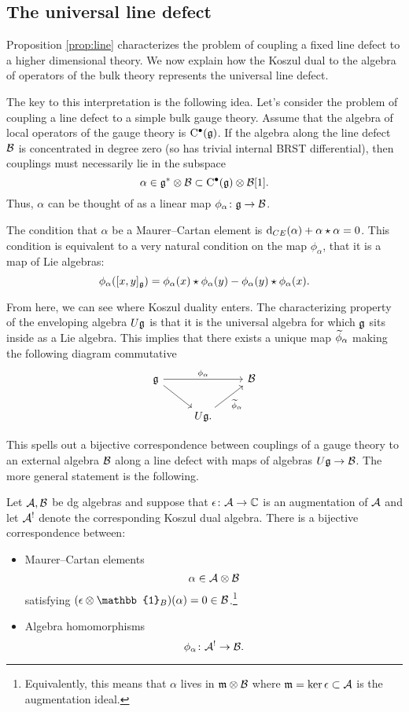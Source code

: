 \documentclass[11pt]{amsart}
\def\id{\mathbb{1}}
\begin{document}
\subsection{The universal line defect}
\label{sec:univ}

Proposition \ref{prop:line} characterizes the problem of coupling a fixed line defect to a higher dimensional theory. 
We now explain how the Koszul dual to the algebra of operators of the bulk theory represents the universal line defect. 

The key to this interpretation is the following idea.
Let's consider the problem of coupling a line defect to a simple bulk gauge theory. 
Assume that the algebra of local operators of the gauge theory is ${\rm C}^\bullet(\mathfrak g)$.
If the algebra along the line defect $\mathcal B$ is concentrated in degree zero (so has trivial internal BRST differential), then couplings must necessarily lie in the subspace
\[
\alpha \in \mathfrak g^* \otimes \mathcal B \subset {\rm C}^\bullet(\mathfrak g) \otimes \mathcal B [1] .
\]
Thus, $\alpha$ can be thought of as a linear map $\phi_\alpha \colon \mathfrak g \to \mathcal B$. 

The condition that $\alpha$ be a Maurer--Cartan element is ${\rm d}_{CE} (\alpha) + \alpha \star \alpha = 0$.
This condition is equivalent to a very natural condition on the map $\phi_\alpha$, that it is a map of Lie algebras:
\[
\phi_\alpha ([x,y]_\mathfrak g) = \phi_\alpha(x) \star \phi_\alpha(y) - \phi_\alpha(y) \star \phi_\alpha(x) .
\]

From here, we can see where Koszul duality enters. 
The characterizing property of the enveloping algebra $U \mathfrak g$ is that it is the universal algebra for which $\mathfrak g$ sits inside as a Lie algebra. 
This implies that there exists a unique map $\widetilde \phi_\alpha$ making the following diagram commutative
\[
\begin{tikzcd}
\fg \ar[dr] \ar[rr, "\phi_\alpha"] & & \cB \\
& U \fg \ar[ur, "\til \phi_\alpha"'] .
\end{tikzcd}
\]

This spells out a bijective correspondence between couplings of a gauge theory to an external algebra $\mathcal B$ along a line defect with maps of algebras $U \mathfrak g \to \mathcal B$. 
The more general statement is the following.  

\begin{prop}
\label{prop:kd}
Let $\mathcal A,\mathcal B$ be dg algebras and suppose that $\epsilon \colon \mathcal A \to \mathbb C$ is an augmentation of $\mathcal A$ and let $\mathcal A^!$ denote the corresponding Koszul dual algebra. 
There is a bijective correspondence between:
\begin{itemize}
\item Maurer--Cartan elements 
\[
\alpha \in \mathcal A \otimes \mathcal B 
\]
satisfying $(\ep \otimes \id_B) (\alpha) = 0 \in \cB$.\footnote{Equivalently, this means that $\alpha$ lives in $\mathfrak{m} \otimes \mathcal B$ where $\mathfrak{m} = \ker \epsilon \subset \mathcal A$ is the augmentation ideal.}
\item Algebra homomorphisms 
\[
\phi_\alpha \colon \mathcal A^! \to \mathcal B .
\]
\end{itemize}
\end{prop}
\end{document}
